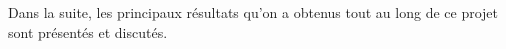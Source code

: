 

Dans la suite, les principaux résultats qu'on a obtenus tout au long de ce projet sont présentés et discutés.